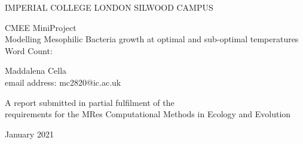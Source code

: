 \documentclass[a4paper]{article}
\newcommand\wordcount{} %
\begin{document}
	\begin{center}
		{\large IMPERIAL COLLEGE LONDON SILWOOD CAMPUS}
	\end{center}
	\vspace{4cm}
	
	\begin{center}
		
		\Huge CMEE MiniProject\\Modelling Mesophilic Bacteria growth at optimal and sub-optimal temperatures\\		
		\vspace{1cm}		
		\large {Word Count: \wordcount}
		
	\end{center}
	\vspace{2cm}
	\begin{center}
		\Large Maddalena Cella\\email address: mc2820@ic.ac.uk
	\end{center}
	
	\vspace{5cm}
	\begin{center}
		{\large A report submitted in partial fulfilment of the \\requirements for the MRes Computational Methods in Ecology and Evolution }
	\end{center}
	
	\begin{center}
		{\large January 2021}
	\end{center}		

	\newpage

\cleardoublepage{}
\end{document}
